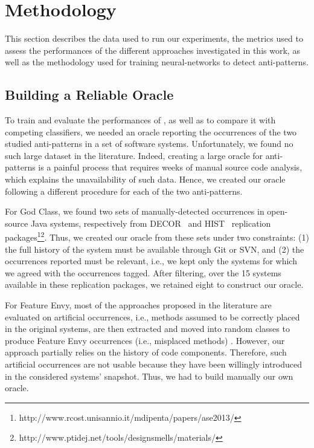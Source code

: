 \section{Methodology}
\label{section: methodology}
This section describes the data used to run our experiments, the metrics used to assess the performances of the different approaches investigated in this work, as well as the methodology used for training neural-networks to detect anti-patterns.
\subsection{Building a Reliable Oracle}
\label{Subsection: oracle}

To train and evaluate the performances of \NAME{}, as well as to compare it with competing classifiers, we needed an oracle reporting the occurrences of the two studied anti-patterns in a set of software systems. Unfortunately, we found no such large dataset in the literature. Indeed, creating a large oracle for anti-patterns is a painful process that requires weeks of manual source code analysis, which explains the unavailability of such data. Hence, we created our oracle following a different procedure for each of the two anti-patterns. 

For God Class, we found two sets of manually-detected occurrences in open-source Java systems, respectively from DECOR~\cite{Moha10-TSE-DECOR} and HIST~\cite{PalombaBPOLP13} replication packages\footnote{ http://www.rcost.unisannio.it/mdipenta/papers/ase2013/}\footnote{http://www.ptidej.net/tools/designsmells/materials/}. Thus, we created our oracle from these sets under two constraints: (1) the full history of the system must be available through Git or SVN, and (2) the occurrences reported must be relevant, i.e., we kept only the systems for which we agreed with the occurrences tagged. After filtering, over the 15 systems available in these replication packages, we retained eight to construct our oracle.  

For Feature Envy, most of the approaches proposed in the literature are evaluated on artificial occurrences, i.e., methods assumed to be correctly placed in the original systems, are then extracted and moved into random classes to produce Feature Envy occurrences (i.e., misplaced methods) \cite{moghadam2012automated, sales2013recommending, liu2018deep}. However, our approach partially relies on the history of code components. Therefore, such artificial occurrences are not usable because they have been willingly introduced in the considered systems' snapshot. Thus, we had to build manually our own oracle.

